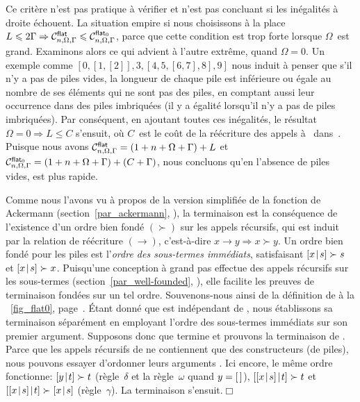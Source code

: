  Ce critère n'est pas pratique à vérifier
et n'est pas concluant si les inégalités à droite échouent. La
situation empire si nous choisissons à la place \(L \leqslant 2\Gamma
\Rightarrow \smash[t]{\C{\fun{flat}}{n,\Omega,\Gamma}} \leqslant
\smash[t]{\C{\fun{flat}_0}{n,\Omega,\Gamma}}\), parce que cette
condition est trop forte lorsque \(\Omega\)~est grand. Examinons alors
ce qui advient à l'autre extrême, quand \(\Omega = 0\). Un exemple
comme \([0,[1,[2]],3,[4,5,[6,7],8],9]\) nous induit à penser que s'il
n'y a pas de piles vides, la longueur de chaque pile est inférieure ou
égale au nombre de ses éléments qui ne sont pas des piles, en comptant
aussi leur occurrence dans des piles imbriquées (il y a égalité
lorsqu'il n'y a pas de piles imbriquées). Par conséquent, en ajoutant
toutes ces inégalités, le résultat \(\Omega = 0 \Rightarrow L
\leqslant C\) s'ensuit, où \(C\)~est le coût de la réécriture des
appels à~
dans~. Puisque nous
avons \(\C{\fun{flat}}{n,\Omega,\Gamma} = (1 + n + \Omega + \Gamma) +
L\) et \(\C{\smash{\fun{flat}_0}}{n,\Omega,\Gamma} = (1 + n + \Omega +
\Gamma) + (C + \Gamma)\), nous concluons qu'en l'absence de piles
vides,  est plus rapide.

\label{flattening_termination}

Comme nous l'avons vu à propos de la version simplifiée de la fonction
de Ackermann (section~\ref{par_ackermann}, ),
la terminaison est la conséquence de l'existence d'un ordre bien fondé
\((\succ)\) sur les appels récursifs, qui est induit par la relation
de réécriture \((\rightarrow)\), c'est-à-dire \(x \rightarrow y
\Rightarrow x \succ y\). Un ordre bien fondé pour les piles est
l'\emph{ordre des sous-termes immédiats}, satisfaisant \(\cons{x}{s}
\succ s\) et \(\cons{x}{s} \succ x\). Puisqu'une conception à grand
pas effectue des appels récursifs sur les sous-termes
(section~\ref{par_well-founded}, ), elle
facilite les preuves de terminaison fondées sur un tel
ordre. Souvenons-nous ainsi de la définition de
 à la
\fig~\ref{fig_flat0}, page~\pageref{fig_flat0}. Étant donné que
 est indépendant de
, nous établissons sa terminaison séparément en
employant l'ordre des sous-termes immédiats sur son premier
argument. Supposons donc que  termine et prouvons la
terminaison de . Parce que les appels récursifs de
 ne contiennent que des constructeurs (de piles),
nous pouvons essayer d'ordonner leurs arguments
\citep{ArtsGiesl_1996}. Ici encore, le même ordre fonctionne:
\(\cons{y}{t} \succ t\) (règle~\(\delta\) et la règle~\(\omega\) quand
\(y=\el\)), \(\cons{\cons{x}{s}}{t} \succ t\) et
\(\cons{\cons{x}{s}}{t} \succ \cons{x}{s}\) (règle~\(\gamma\)). La
terminaison s'ensuit.\hfill\(\Box\)

